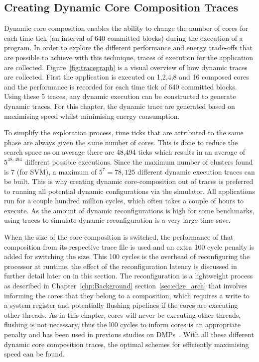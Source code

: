 \subsection{Creating Dynamic Core Composition Traces}

Dynamic core composition enables the ability to change the number of cores for each time tick (an interval of 640 committed blocks) during the execution of a program.
In order to explore the different performance and energy trade-offs that are possible to achieve with this technique, traces of execution for the application are collected.
Figure~\ref{fig:tracegraph} is a visual overview of how dynamic traces are collected.
First the application is executed on 1,2,4,8 and 16 composed cores and the performance is recorded for each time tick of 640 committed blocks.
Using these 5 traces, any dynamic execution can be constructed to generate dynamic traces.
For this chapter, the dynamic trace are generated based on maximising speed whilst minimising energy consumption.

To simplify the exploration process, time ticks that are attributed to the same phase are always given the same number of cores.
This is done to reduce the search space as on average there are 48,494 ticks which results in an average of $5^{48,494}$ different possible executions.
Since the maximum number of clusters found is 7 (for SVM), a maximum of $5^{7} = 78,125$ different dynamic execution traces can be built.
This is why creating dynamic core-composition out of traces is preferred to running all potential dynamic configurations via the simulator.
All applications run for a couple hundred million cycles, which often takes a couple of hours to execute.
As the amount of dynamic reconfigurations is high for some benchmarks, using traces to simulate dynamic reconfiguration is a very large time-save.

When the size of the core composition is switched, the performance of that composition from its respective trace file is used and an extra 100 cycle penalty is added for switching the size.
This 100 cycles is the overhead of reconfiguring the processor at runtime, the effect of the reconfiguration latency is discussed in further detail later on in this section.
The reconfiguration is a lightweight process as described in Chapter~\ref{chp:Background} section~\ref{sec:edge_arch} that involves informing the cores that they belong to a composition, which requires a write to a system register and potentially flushing pipelines if the cores are executing other threads.
As in this chapter, cores will never be executing other threads, flushing is not necessary, thus the l00 cycles to inform cores is an appropriate penalty and has been used in previous studies on DMPs~\cite{pricopi2012bahurupi}.
With all these different dynamic core composition traces, the optimal schemes for efficiently maximising speed can be found.

